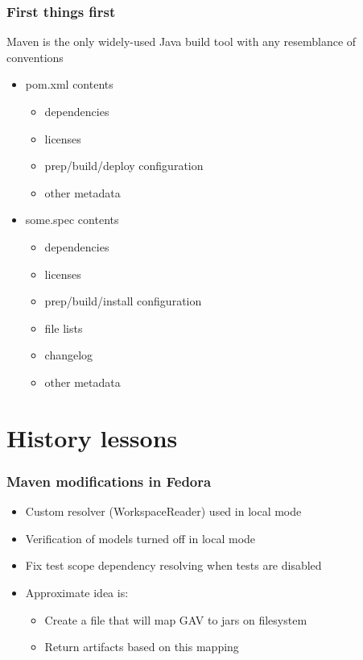 \documentclass[pdftex,unicode,xcolor=table]{beamer}
\begin{document}
\begin{frame}
  \frametitle{First things first}
Maven is the only widely-used Java build tool with any resemblance of
      conventions
  \begin{itemize}
  \item pom.xml contents
    \begin{itemize}
    \item dependencies
    \item licenses
    \item prep/build/deploy configuration
    \item other metadata
    \end{itemize}
  \item some.spec contents
    \begin{itemize}
    \item dependencies
    \item licenses
    \item prep/build/install configuration
    \item file lists
    \item changelog
    \item other metadata
    \end{itemize}
  \end{itemize}
\end{frame}

\section{History lessons}
\begin{frame}
\frametitle{Maven modifications in Fedora}
\begin{itemize}
\item Custom resolver (WorkspaceReader) used in local mode
\item Verification of models turned off in local mode
\item Fix test scope dependency resolving when tests are disabled
\item Approximate idea is:
  \begin{itemize}
  \item Create a file that will map GAV to jars on filesystem
  \item Return artifacts based on this mapping
  \end{itemize}
\end{itemize}
\end{frame}
\end{document}
